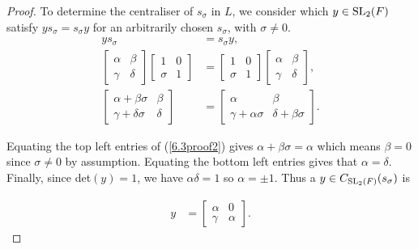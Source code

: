     \begin{proof}
    To determine the centraliser of $s_\sigma$ in $L$, we consider which $y \in \operatorname{SL}_2(F)$satisfy $y s_\sigma = s_\sigma y$ for an arbitrarily chosen $s_\sigma$, with $\sigma \neq 0$. \\
    \vspace{-0.5mm}
    \begin{align}\label{6.3proof2} y s_\sigma &= s_\sigma y, \nonumber \\[1.5ex]
    \begin{bmatrix} \alpha & \beta \\ \gamma & \delta \end{bmatrix} \begin{bmatrix} 1 & 0 \\ \sigma & 1 \end{bmatrix} &= \begin{bmatrix} 1 & 0 \\ \sigma & 1 \end{bmatrix} \begin{bmatrix} \alpha & \beta \\ \gamma & \delta \end{bmatrix}, \nonumber \\[1.5ex]
    \begin{bmatrix} \alpha + \beta \sigma & \beta \\ \gamma + \delta \sigma & \delta \end{bmatrix} &= \begin{bmatrix} \alpha & \beta \\ \gamma +  \alpha \sigma & \delta + \beta \sigma \end{bmatrix}.
    \end{align}
    \vspace{.5mm}
    
    Equating the top left entries of (\ref{6.3proof2}) gives $\alpha + \beta \sigma = \alpha$ which means $\beta = 0$ since $\sigma \neq 0$ by assumption. Equating the bottom left entries gives that $\alpha = \delta$. Finally, since det$(y) = 1$, we have $\alpha \delta = 1$ so $\alpha = \pm 1$. Thus a $y \in C_{\operatorname{SL}_2(F)}(s_\sigma)$ is
    
    \begin{align*} y &= \begin{bmatrix} \alpha & 0 \\ \gamma & \alpha \end{bmatrix}. \tag{where $\alpha = \pm 1$}
    \end{align*}
    

\end{proof}
